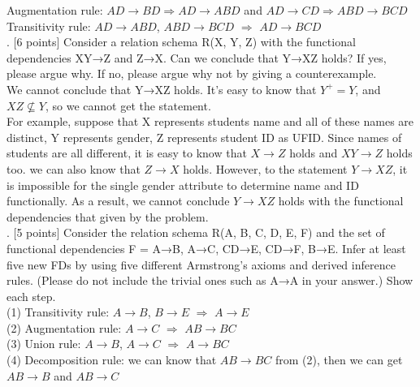 \documentclass[]{article}
\begin{document}
	Augmentation rule: $AD\rightarrow BD \Longrightarrow AD\rightarrow ABD$ and $AD\rightarrow CD \Longrightarrow ABD\rightarrow BCD$  \\
	
	Transitivity rule: $AD\rightarrow ABD$, $ABD\rightarrow BCD$ $\Longrightarrow$  $AD\rightarrow BCD$   \\
	
	. [6 points] Consider a relation schema R(X, Y, Z) with the functional dependencies XY→Z and Z→X. Can we conclude that Y→XZ holds? If yes, please argue why. If no, please argue why not by giving a counterexample.  \\
	
	\noindent We cannot conclude that  Y→XZ holds. It's easy to know that $Y^{+} = Y$, and $XZ \not\subseteq Y$, so we cannot get the statement.   \\
	
	\noindent For example, suppose that X represents students name and all of these names are distinct, Y represents gender, Z represents student ID as UFID. Since names of students are all different, it is easy to know that $X\rightarrow Z$ holds and $XY\rightarrow Z$ holds too. we can also know that $Z\rightarrow X$ holds. However, to the statement $Y\rightarrow XZ$, it is impossible for the single gender attribute to determine name and ID functionally. As a result, we cannot conclude $Y\rightarrow XZ$ holds with the functional dependencies that given by the problem.   \\
	
	. [5 points] Consider the relation schema R(A, B, C, D, E, F) and the set of functional dependencies F = {A→B, A→C, CD→E, CD→F, B→E}. Infer at least five new FDs by using five different Armstrong’s axioms and derived inference rules. (Please do not include the trivial ones such as A→A in your answer.) Show each step.  \\
	
	(1) Transitivity rule: $A\rightarrow B$, $B\rightarrow E$ $\Longrightarrow$  $A\rightarrow E$   \\
	
	(2) Augmentation rule: $A\rightarrow C$ $\Longrightarrow$  $AB\rightarrow BC$   \\
	
	(3) Union rule: $A\rightarrow B$, $A\rightarrow C$ $\Longrightarrow$  $A\rightarrow BC$   \\
	
	(4) Decomposition rule: we can know that $AB\rightarrow BC$ from (2), then we can get $AB\rightarrow B$ and $AB\rightarrow C$   \\
	
\end{document}
